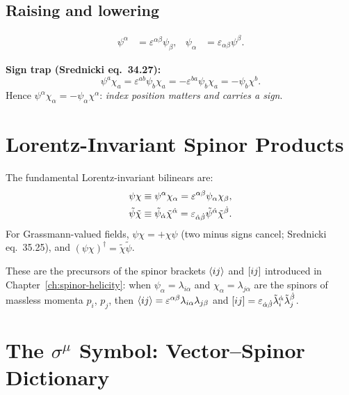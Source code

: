 \subsection{Raising and lowering}

\begin{align}
  \psi^\alpha &= \varepsilon^{\alpha\beta}\psi_\beta, &
  \psi_\alpha &= \varepsilon_{\alpha\beta}\psi^\beta.
\end{align}

\textbf{Sign trap (Srednicki eq.~34.27):}
\begin{equation}
  \psi^a\chi_a = \varepsilon^{ab}\psi_b\chi_a = -\varepsilon^{ba}\psi_b\chi_a = -\psi_b\chi^b.
\end{equation}
Hence $\psi^\alpha\chi_\alpha = -\psi_\alpha\chi^\alpha$: \emph{index
position matters and carries a sign}.

\section{Lorentz-Invariant Spinor Products}

The fundamental Lorentz-invariant bilinears are:
\begin{align}
  \psi\chi &\equiv \psi^\alpha\chi_\alpha
  = \varepsilon^{\alpha\beta}\psi_\alpha\chi_\beta, \label{eq:angle-bra}\\
  \tilde\psi\tilde\chi &\equiv \tilde\psi_{\dot{\alpha}}\tilde\chi^{\dot{\alpha}}
  = \varepsilon_{\dot{\alpha}\dot{\beta}}\tilde\psi^{\dot{\alpha}}\tilde\chi^{\dot{\beta}}. \label{eq:square-bra}
\end{align}
For Grassmann-valued fields, $\psi\chi = +\chi\psi$ (two minus signs cancel;
Srednicki eq.~35.25), and $(\psi\chi)^\dagger = \tilde\chi\tilde\psi$.

These are the precursors of the spinor brackets $\langle i j \rangle$ and
$[ i j ]$ introduced in Chapter~\ref{ch:spinor-helicity}: when
$\psi_\alpha = \lambda_{i\alpha}$ and $\chi_\alpha = \lambda_{j\alpha}$ are
the spinors of massless momenta $p_i$, $p_j$, then
$\langle i j \rangle = \varepsilon^{\alpha\beta}\lambda_{i\alpha}\lambda_{j\beta}$
and $[ i j ] = \varepsilon_{\dot{\alpha}\dot{\beta}}\tilde\lambda_i^{\dot{\alpha}}\tilde\lambda_j^{\dot{\beta}}$.

\section{The \texorpdfstring{$\sigma^\mu$}{sigma\^{}mu} Symbol:
  Vector--Spinor Dictionary}

